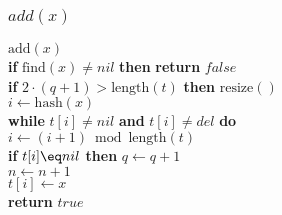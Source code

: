 \documentclass{beamer}
\begin{document}
\begin{frame}
	\frametitle{$add(x)$}
\begin{oframed}
\begin{flushleft}
\hspace*{1em} \ensuremath{\mathrm{add}(x)}\\
\hspace*{1em} \hspace*{1em} {\color{black} \textbf{if}} \ensuremath{\mathrm{find}(x) \ne nil} {\color{black} \textbf{then}}  {\color{black} \textbf{return}} \ensuremath{\ensuremath{\mathit{false}}}\\
\hspace*{1em} \hspace*{1em} {\color{black} \textbf{if}} \ensuremath{2\cdot (q+1) > \mathrm{length}(t)} {\color{black} \textbf{then}}  \ensuremath{\mathrm{resize}()}\\
\hspace*{1em} \hspace*{1em} \ensuremath{i \gets  \ensuremath{\mathrm{hash}(x)}}\\
\hspace*{1em} \hspace*{1em} {\color{black} \textbf{while}} \ensuremath{t[i] \ne nil} {\color{black} \textbf{and}} \ensuremath{t[i] \ne \mathit{del}} {\color{black} \textbf{do}} \\
\hspace*{1em} \hspace*{1em} \hspace*{1em} \ensuremath{i \gets  \ensuremath{(i + 1) \bmod  \mathrm{length}(t)}}\\
\hspace*{1em} \hspace*{1em} {\color{black} \textbf{if}} \ensuremath{t[i] \eq nil} {\color{black} \textbf{then}}  \ensuremath{q \gets  \ensuremath{q + 1}}\\
\hspace*{1em} \hspace*{1em} \ensuremath{n \gets  \ensuremath{n + 1}}\\
\hspace*{1em} \hspace*{1em} \ensuremath{t[i] \gets  x}\\
\hspace*{1em} \hspace*{1em} {\color{black} \textbf{return}} \ensuremath{\ensuremath{\mathit{true}}}\\
\end{flushleft}
\end{oframed}

\end{frame}
\end{document}
